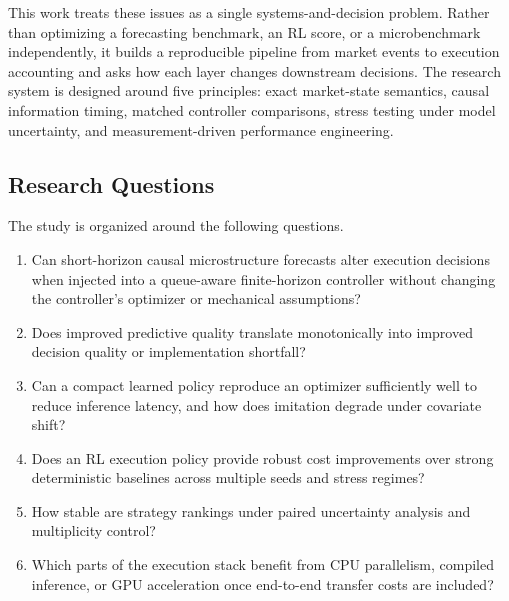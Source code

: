 \documentclass[journal,10pt]{IEEEtran}
\newcommand{\1}{\mathbf{1}}
\begin{document}
This work treats these issues as a single systems-and-decision problem. Rather than optimizing a forecasting benchmark, an RL score, or a microbenchmark independently, it builds a reproducible pipeline from market events to execution accounting and asks how each layer changes downstream decisions. The research system is designed around five principles: exact market-state semantics, causal information timing, matched controller comparisons, stress testing under model uncertainty, and measurement-driven performance engineering.

\subsection{Research Questions}
The study is organized around the following questions.
\begin{enumerate}[leftmargin=*,label=\textbf{RQ\arabic*:}]
    \item Can short-horizon causal microstructure forecasts alter execution decisions when injected into a queue-aware finite-horizon controller without changing the controller's optimizer or mechanical assumptions?
    \item Does improved predictive quality translate monotonically into improved decision quality or implementation shortfall?
    \item Can a compact learned policy reproduce an optimizer sufficiently well to reduce inference latency, and how does imitation degrade under covariate shift?
    \item Does an RL execution policy provide robust cost improvements over strong deterministic baselines across multiple seeds and stress regimes?
    \item How stable are strategy rankings under paired uncertainty analysis and multiplicity control?
    \item Which parts of the execution stack benefit from CPU parallelism, compiled inference, or GPU acceleration once end-to-end transfer costs are included?
\end{enumerate}
\end{document}
